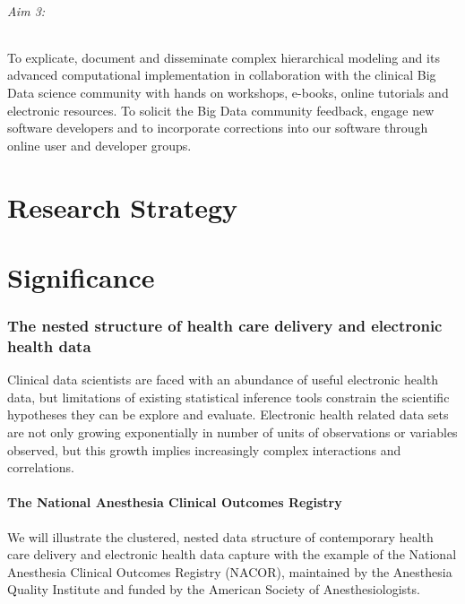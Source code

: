 \documentclass[11pt,notitlepage]{article}
\begin{document}
\paragraph*{Aim 3:} To explicate, document and disseminate complex hierarchical modeling and its advanced computational implementation in collaboration with the clinical Big Data science community with hands on workshops, e-books, online tutorials and electronic resources. To solicit the Big Data community feedback, engage new software developers and to incorporate corrections into our software through online user and developer groups.

\part*{Research Strategy}

\part*{Significance}

\section*{The nested structure of health care delivery and electronic health data}
Clinical data scientists are faced with an abundance of useful electronic health data, but limitations of existing statistical inference tools constrain the scientific hypotheses they can be explore and evaluate. Electronic health related data sets are not only growing exponentially in number of units of observations or variables observed, but this growth implies increasingly complex interactions and correlations.  

\subsection*{The National Anesthesia Clinical Outcomes Registry}
We will illustrate the clustered, nested data structure of contemporary health care delivery and electronic health data capture with the example of the National Anesthesia Clinical Outcomes Registry (NACOR), maintained by the Anesthesia Quality Institute and funded by the American Society of Anesthesiologists. 
\end{document}
